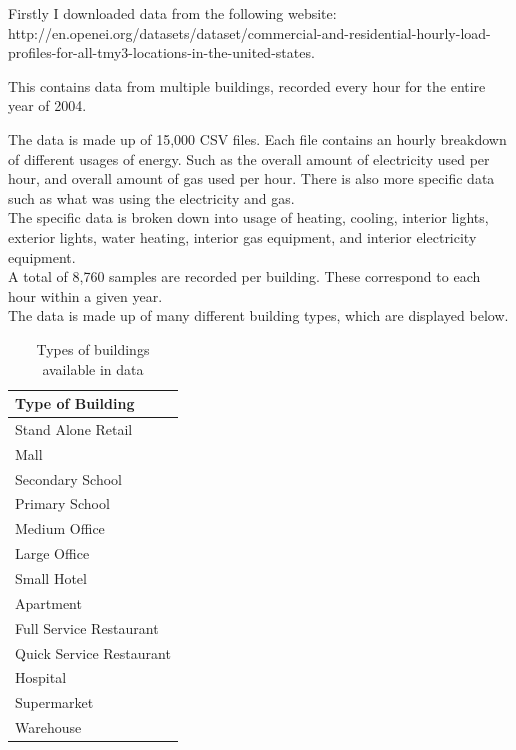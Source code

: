 \documentclass[12pt]{article}\usepackage[]{graphicx}\usepackage[]{color}
\begin{document}
Firstly I downloaded data from the following website:\\
http://en.openei.org/datasets/dataset/commercial-and-residential-hourly-load-profiles-for-all-tmy3-locations-in-the-united-states.

This contains data from multiple buildings, recorded every hour for the entire year of 2004.

The data is made up of 15,000 CSV files. Each file contains an hourly breakdown of different usages of energy. Such as the overall amount of electricity used per hour, and overall amount of gas used per hour. There is also more specific data such as what was using the electricity and gas. \\

The specific data is broken down into usage of heating, cooling, interior lights, exterior lights, water heating, interior gas equipment, and interior electricity equipment.\\

A total of 8,760 samples are recorded per building. These correspond to each hour within a given year.\\

The data is made up of many different building types, which are displayed below. 

\begin{table}[]
\centering
\label{my-label}
\begin{tabular}{|l|}
\hline
\textbf{Type of Building} \\ \hline
Stand Alone Retail        \\ \hline
Mall                      \\ \hline
Secondary School          \\ \hline
Primary School            \\ \hline
Medium Office             \\ \hline
Large Office              \\ \hline
Small Hotel               \\ \hline
Apartment                 \\ \hline
Full Service Restaurant   \\ \hline
Quick Service Restaurant  \\ \hline
Hospital                  \\ \hline
Supermarket               \\ \hline
Warehouse                 \\ \hline
\end{tabular}
\caption{Types of buildings available in data}
\end{table}
\end{document}
